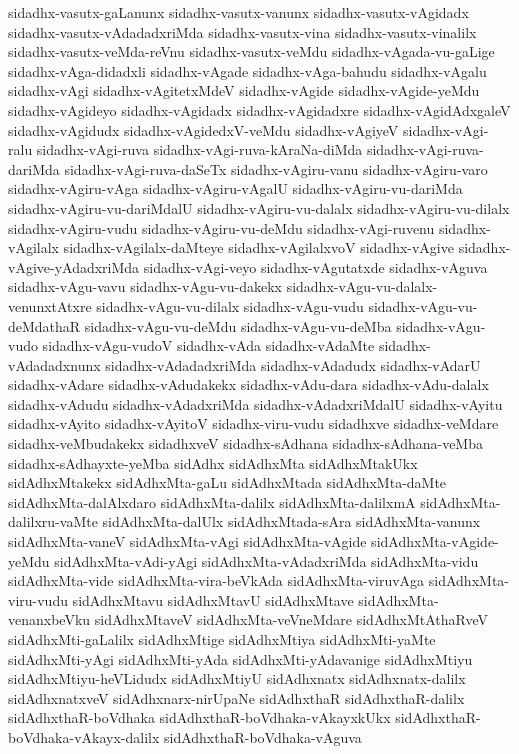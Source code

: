 {sidadhx-vasutx-gaLanunx
sidadhx-vasutx-vanunx
sidadhx-vasutx-vAgidadx
sidadhx-vasutx-vAdadadxriMda
sidadhx-vasutx-vina
sidadhx-vasutx-vinalilx
sidadhx-vasutx-veMda-reVnu
sidadhx-vasutx-veMdu
sidadhx-vAgada-vu-gaLige
sidadhx-vAga-didadxli
sidadhx-vAgade
sidadhx-vAga-bahudu
sidadhx-vAgalu
sidadhx-vAgi
sidadhx-vAgitetxMdeV
sidadhx-vAgide
sidadhx-vAgide-yeMdu
sidadhx-vAgideyo
sidadhx-vAgidadx
sidadhx-vAgidadxre
sidadhx-vAgidAdxgaleV
sidadhx-vAgidudx
sidadhx-vAgidedxV-veMdu
sidadhx-vAgiyeV
sidadhx-vAgi-ralu
sidadhx-vAgi-ruva
sidadhx-vAgi-ruva-kAraNa-diMda
sidadhx-vAgi-ruva-dariMda
sidadhx-vAgi-ruva-daSeTx
sidadhx-vAgiru-vanu
sidadhx-vAgiru-varo
sidadhx-vAgiru-vAga
sidadhx-vAgiru-vAgalU
sidadhx-vAgiru-vu-dariMda
sidadhx-vAgiru-vu-dariMdalU
sidadhx-vAgiru-vu-dalalx
sidadhx-vAgiru-vu-dilalx
sidadhx-vAgiru-vudu
sidadhx-vAgiru-vu-deMdu
sidadhx-vAgi-ruvenu
sidadhx-vAgilalx
sidadhx-vAgilalx-daMteye
sidadhx-vAgilalxvoV
sidadhx-vAgive
sidadhx-vAgive-yAdadxriMda
sidadhx-vAgi-veyo
sidadhx-vAgutatxde
sidadhx-vAguva
sidadhx-vAgu-vavu
sidadhx-vAgu-vu-dakekx
sidadhx-vAgu-vu-dalalx-venunxtAtxre
sidadhx-vAgu-vu-dilalx
sidadhx-vAgu-vudu
sidadhx-vAgu-vu-deMdathaR
sidadhx-vAgu-vu-deMdu
sidadhx-vAgu-vu-deMba
sidadhx-vAgu-vudo
sidadhx-vAgu-vudoV
sidadhx-vAda
sidadhx-vAdaMte
sidadhx-vAdadadxnunx
sidadhx-vAdadadxriMda
sidadhx-vAdadudx
sidadhx-vAdarU
sidadhx-vAdare
sidadhx-vAdudakekx
sidadhx-vAdu-dara
sidadhx-vAdu-dalalx
sidadhx-vAdudu
sidadhx-vAdadxriMda
sidadhx-vAdadxriMdalU
sidadhx-vAyitu
sidadhx-vAyito
sidadhx-vAyitoV
sidadhx-viru-vudu
sidadhxve
sidadhx-veMdare
sidadhx-veMbudakekx
sidadhxveV
sidadhx-sAdhana
sidadhx-sAdhana-veMba
sidadhx-sAdhayxte-yeMba
sidAdhx
sidAdhxMta
sidAdhxMtakUkx
sidAdhxMtakekx
sidAdhxMta-gaLu
sidAdhxMtada
sidAdhxMta-daMte
sidAdhxMta-dalAlxdaro
sidAdhxMta-dalilx
sidAdhxMta-dalilxmA
sidAdhxMta-dalilxru-vaMte
sidAdhxMta-dalUlx
sidAdhxMtada-sAra
sidAdhxMta-vanunx
sidAdhxMta-vaneV
sidAdhxMta-vAgi
sidAdhxMta-vAgide
sidAdhxMta-vAgide-yeMdu
sidAdhxMta-vAdi-yAgi
sidAdhxMta-vAdadxriMda
sidAdhxMta-vidu
sidAdhxMta-vide
sidAdhxMta-vira-beVkAda
sidAdhxMta-viruvAga
sidAdhxMta-viru-vudu
sidAdhxMtavu
sidAdhxMtavU
sidAdhxMtave
sidAdhxMta-venanxbeVku
sidAdhxMtaveV
sidAdhxMta-veVneMdare
sidAdhxMtAthaRveV
sidAdhxMti-gaLalilx
sidAdhxMtige
sidAdhxMtiya
sidAdhxMti-yaMte
sidAdhxMti-yAgi
sidAdhxMti-yAda
sidAdhxMti-yAdavanige
sidAdhxMtiyu
sidAdhxMtiyu-heVLidudx
sidAdhxMtiyU
sidAdhxnatx
sidAdhxnatx-dalilx
sidAdhxnatxveV
sidAdhxnarx-nirUpaNe
sidAdhxthaR
sidAdhxthaR-dalilx
sidAdhxthaR-boVdhaka
sidAdhxthaR-boVdhaka-vAkayxkUkx
sidAdhxthaR-boVdhaka-vAkayx-dalilx
sidAdhxthaR-boVdhaka-vAguva
}
